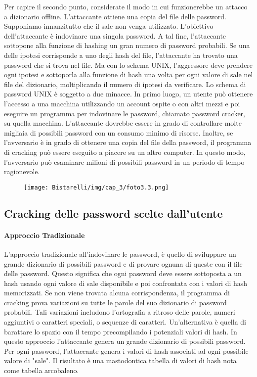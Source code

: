 Per capire il secondo punto, considerate il modo in cui funzionerebbe un attacco a dizionario offline. L'attaccante ottiene una copia del file delle password. Supponiamo innanzitutto che il sale non venga utilizzato. L'obiettivo dell'attaccante è indovinare una singola password. A tal fine, l'attaccante sottopone alla funzione di hashing un gran numero di password probabili. Se una delle ipotesi corrisponde a uno degli hash del file, l'attaccante ha trovato una password che si trova nel file. Ma con lo schema UNIX, l'aggressore deve prendere ogni ipotesi e sottoporla alla funzione di hash una volta per ogni valore di sale nel file del dizionario, moltiplicando il numero di ipotesi da verificare. Lo schema di password UNIX è soggetto a due minacce. In primo luogo, un utente può ottenere l'accesso a una macchina utilizzando un account ospite o con altri mezzi e poi eseguire un programma per indovinare le password, chiamato password cracker, su quella macchina. L'attaccante dovrebbe essere in grado di controllare molte migliaia di possibili password con un consumo minimo di risorse. Inoltre, se l'avversario è in grado di ottenere una copia del file della password, il programma di cracking può essere eseguito a piacere su un altro computer. In questo modo, l'avversario può esaminare milioni di possibili password in un periodo di tempo ragionevole.

\begin{figure}[H]
	\centering
    \texttt{[image: Bistarelli/img/cap\_3/foto3.3.png]}
\end{figure}

\newpage
\subsection{Cracking delle password scelte dall'utente}

\paragraph{Approccio Tradizionale}
L'approccio tradizionale all'indovinare le password, è quello di sviluppare un grande dizionario di possibili password e di provare ognuna di queste con il file delle password. Questo significa che ogni password deve essere sottoposta a un hash usando ogni valore di sale disponibile e poi confrontata con i valori di hash memorizzati. Se non viene trovata alcuna corrispondenza, il programma di cracking prova variazioni su tutte le parole del suo dizionario di password probabili. Tali variazioni includono l'ortografia a ritroso delle parole, numeri aggiuntivi o caratteri speciali, o sequenze di caratteri. Un'alternativa è quella di barattare lo spazio con il tempo precompilando i potenziali valori di hash. In questo approccio l'attaccante genera un grande dizionario di possibili password. Per ogni password, l'attaccante genera i valori di hash associati ad ogni possibile valore di "sale". Il risultato è una mastodontica tabella di valori di hash nota come tabella arcobaleno.
\\
